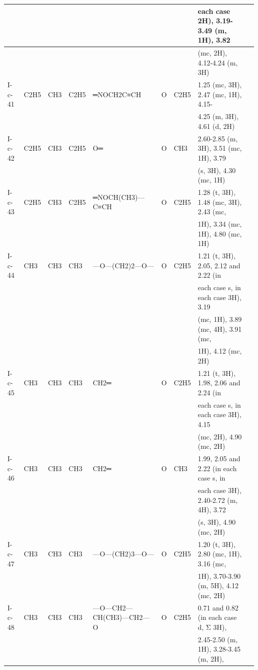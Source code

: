 \documentclass[11pt,a4paper]{article}
\begin{document}
\begin{table}[h]
\begin{tabular}{|l|l|l|l|l|l|l|l|l|}
 &  &  &  &  &  &  & each case 2H), 3.19-3.49 (m, 1H), 3.82 &  \\ \hline
 &  &  &  &  &  &  & (mc, 2H), 4.12-4.24 (m, 3H) &  \\ \hline
I-c-41 & C2H5 & CH3 & C2H5 & ═NOCH2C≡CH & O & C2H5 & 1.25 (mc, 3H), 2.47 (mc, 1H), 4.15- &  \\ \hline
 &  &  &  &  &  &  & 4.25 (m, 3H), 4.61 (d, 2H) &  \\ \hline
I-c-42 & C2H5 & CH3 & C2H5 & O═ & O & CH3 & 2.60-2.85 (m, 3H), 3.51 (mc, 1H), 3.79 &  \\ \hline
 &  &  &  &  &  &  & (s, 3H), 4.30 (mc, 1H) &  \\ \hline
I-c-43 & C2H5 & CH3 & C2H5 & ═NOCH(CH3)—C≡CH & O & C2H5 & 1.28 (t, 3H), 1.48 (mc, 3H), 2.43 (mc, &  \\ \hline
 &  &  &  &  &  &  & 1H), 3.34 (mc, 1H), 4.80 (mc, 1H) &  \\ \hline
I-c-44 & CH3 & CH3 & CH3 & —O—(CH2)2—O— & O & C2H5 & 1.21 (t, 3H), 2.05, 2.12 and 2.22 (in &  \\ \hline
 &  &  &  &  &  &  & each case s, in each case 3H), 3.19 &  \\ \hline
 &  &  &  &  &  &  & (mc, 1H), 3.89 (mc, 4H), 3.91 (mc, &  \\ \hline
 &  &  &  &  &  &  & 1H), 4.12 (mc, 2H) &  \\ \hline
I-c-45 & CH3 & CH3 & CH3 & CH2═ & O & C2H5 & 1.21 (t, 3H), 1.98, 2.06 and 2.24 (in &  \\ \hline
 &  &  &  &  &  &  & each case s, in each case 3H), 4.15 &  \\ \hline
 &  &  &  &  &  &  & (mc, 2H), 4.90 (mc, 2H) &  \\ \hline
I-c-46 & CH3 & CH3 & CH3 & CH2═ & O & CH3 & 1.99, 2.05 and 2.22 (in each case s, in &  \\ \hline
 &  &  &  &  &  &  & each case 3H), 2.40-2.72 (m, 4H), 3.72 &  \\ \hline
 &  &  &  &  &  &  & (s, 3H), 4.90 (mc, 2H) &  \\ \hline
I-c-47 & CH3 & CH3 & CH3 & —O—(CH2)3—O— & O & C2H5 & 1.20 (t, 3H), 2.80 (mc, 1H), 3.16 (mc, &  \\ \hline
 &  &  &  &  &  &  & 1H), 3.70-3.90 (m, 5H), 4.12 (mc, 2H) &  \\ \hline
I-c-48 & CH3 & CH3 & CH3 & —O—CH2—CH(CH3)—CH2—O & O & C2H5 & 0.71 and 0.82 (in each case d, Σ 3H), &  \\ \hline
 &  &  &  &  &  &  & 2.45-2.50 (m, 1H), 3.28-3.45 (m, 2H), &  \\ \hline

\end{tabular}
\end{table}
\end{document}
